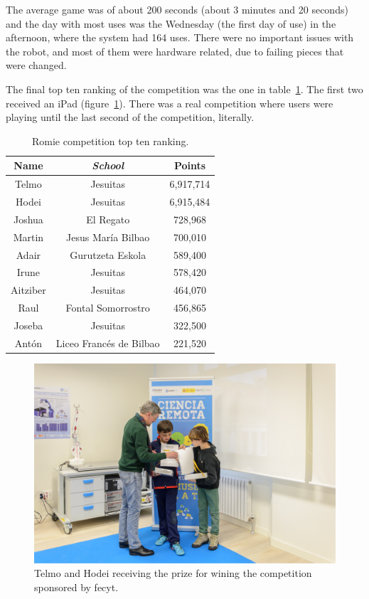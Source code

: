 The average game was of about 200 seconds (about 3 minutes and 20 seconds) and the day with most
uses was the Wednesday (the first day of use) in the afternoon, where the system had 164 uses. There
were no important issues with the robot, and most of them were hardware related, due to failing
pieces that were changed.

The final top ten ranking of the competition was the one in table~\ref{tab:ranking}. The first two
received an iPad (figure~\ref{fig:prizes}). There was a real competition where users were playing
until the last second of the competition, literally.

\begin{table}[ht]
	\centering
	\caption{Romie competition top ten ranking.}\label{tab:ranking}
	\begin{tabular}{ccc}
		\toprule
		\textbf{Name} & \emph{School} & \textbf{Points} \\
		\midrule
		Telmo		& Jesuitas					& 6,917,714	\\
		Hodei		& Jesuitas					& 6,915,484	\\
		Joshua		& El Regato					& 728,968	\\
		Martin		& Jesus María Bilbao		& 700,010	\\
		Adair		& Gurutzeta Eskola			& 589,400	\\
		Irune		& Jesuitas					& 578,420	\\
		Aitziber	& Jesuitas					& 464,070	\\
		Raul		& Fontal Somorrostro		& 456,865	\\
		Joseba		& Jesuitas					& 322,500	\\
		Antón		& Liceo Francés de Bilbao	& 221,520	\\
		\bottomrule
	\end{tabular}
\end{table}

\begin{figure}[ht]
	\centering
	\includegraphics[height=0.3\textheight]{fig/prizes}
	\caption{Telmo and Hodei receiving the prize for wining the competition sponsored by \acrshort{fecyt}.}
	\label{fig:prizes}
\end{figure}

